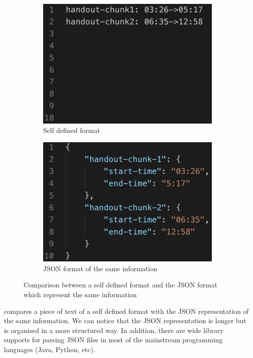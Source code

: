 \begin{figure}[!htb]
  \centering
  \begin{subfigure}{.45\textwidth}
    \includegraphics[width=\textwidth]{txt-example.png}
    \caption{Self defined format}
  \end{subfigure}
  \begin{subfigure}{.45\textwidth}
    \includegraphics[width=\textwidth]{json-example.png}
    \caption{JSON format of the same information}
  \end{subfigure}
  \caption{Comparison between a self defined format and the JSON format which represent the same information}
  \label{fig:txt-json-compare}
\end{figure}

 compares a piece of text of a self defined format with the JSON representation of the same information. We can notice that the JSON representation is longer but is organised in a more structured way. In addition, there are wide library supports for parsing JSON files in most of the mainstream programming languages (Java, Python, etc).




